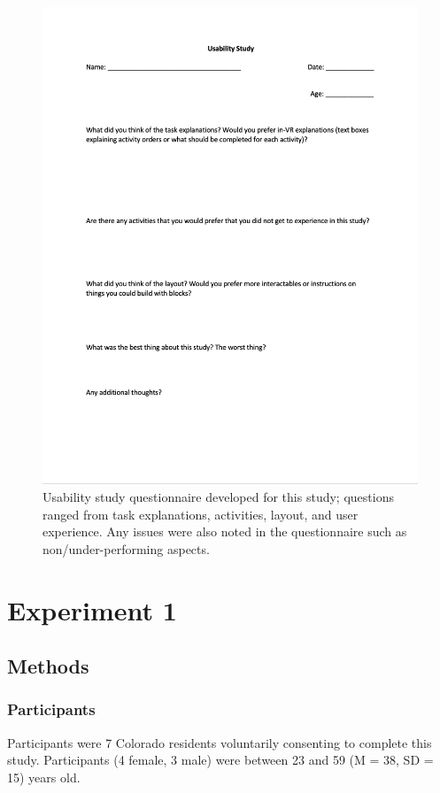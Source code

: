 \documentclass[sigconf]{acmart}
\begin{document}
\begin{figure}[h]
  \centering
  \includegraphics[width=\linewidth]{Usability Q}
  \caption{Usability study questionnaire developed for this study; questions ranged from task explanations, activities, layout, and user experience. Any issues were also noted in the questionnaire such as non/under-performing aspects.}
\end{figure}



\section{Experiment 1}
\subsection{Methods}

\subsubsection{Participants}
Participants were 7 Colorado residents voluntarily consenting to complete this study. Participants (4 female, 3 male) were between 23 and 59 (M = 38, SD = 15) years old.
\end{document}
